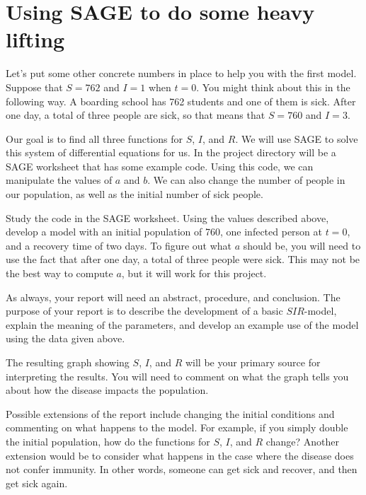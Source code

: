 \documentclass
[justified,nohyper]
{tufte-handout}
\begin{document}
\section{Using SAGE to do some heavy lifting}
Let's put some other concrete numbers in place to help you with the first model.
Suppose that $S=762$ and $I=1$ when $t=0$. You might think about this in the following
way. A boarding school has 762 students and one of them is sick. After one day, a
total of three people are sick, so that means that $S=760$ and $I=3$.

Our goal is to find all three functions for $S$, $I$, and $R$. We will use SAGE to
solve this system of differential equations for us. In the project directory will
be a SAGE worksheet that has some example code. Using this code, we can manipulate
the values of $a$ and $b$. We can also change the number of people in our population,
as well as the initial number of sick people.

Study the code in the SAGE worksheet. Using the values described above, develop a
model with an initial population of 760, one infected person at $t=0$, and a recovery
time of two days. To figure out what $a$ should be, you will need to use the
fact that after one day, a total of three people were sick. This may not be the best
way to compute $a$, but it will work for this project.

As always, your report will need an abstract, procedure, and conclusion. The purpose
of your report is to describe the development of a basic $SIR$-model, explain the
meaning of the parameters, and develop an example use of the model using the data
given above.

The resulting graph showing $S$, $I$, and $R$ will be your primary source for
interpreting the results. You will need to comment on what the graph tells you about
how the disease impacts the population.

Possible extensions of the report include changing the initial conditions and
commenting on what happens to the model. For example, if you simply double 
the initial population,
how do the functions for $S$, $I$, and $R$ change? Another extension would be
to consider what happens in the case where the disease does not confer immunity.
In other words, someone can get sick and recover, and then get sick again.
\end{document}
